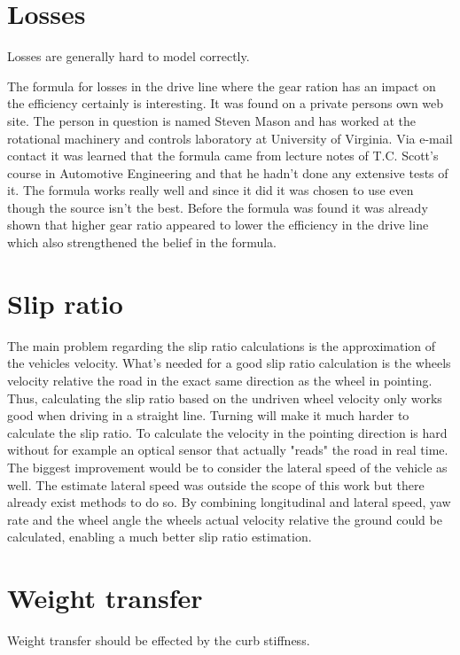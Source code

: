 \section{Losses}
Losses are generally hard to model correctly.

The formula for losses in the drive line where the gear ration has an impact on the efficiency certainly is interesting. It was found on a private persons own web site. The person in question is named Steven Mason and has worked at the rotational machinery and controls laboratory at University of Virginia. Via e-mail contact it was learned that the formula came from lecture notes of T.C. Scott's course in Automotive Engineering and that he hadn't done any extensive tests of it. The formula works really well and since it did it was chosen to use even though the source isn't the best. Before the formula was found it was already shown that higher gear ratio appeared to lower the efficiency in the drive line which also strengthened the belief in the formula. 

\section{Slip ratio}
The main problem regarding the slip ratio calculations is the approximation of the vehicles velocity. What's needed for a good slip ratio calculation is the wheels velocity relative the road in the exact same direction as the wheel in pointing. Thus, calculating the slip ratio based on the undriven wheel velocity only works good when driving in a straight line. Turning will make it much harder to calculate the slip ratio. To calculate the velocity in the pointing direction is hard without for example an optical sensor that actually "reads" the road in real time. The biggest improvement would be to consider the lateral speed of the vehicle as well. The estimate lateral speed was outside the scope of this work but there already exist methods to do so. By combining longitudinal and lateral speed, yaw rate and the wheel angle the wheels actual velocity relative the ground could be calculated, enabling a much better slip ratio estimation.


\section{Weight transfer}
Weight transfer should be effected by the curb stiffness. 